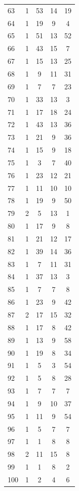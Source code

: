 \documentclass[12pt,a4paper]{report}
\begin{document}
\begin{appendices}
\begin{longtable}{lcccc}
63  &   1 &  53 &  14 &  19 \\
64  &   1 &  19 &   9 &   4 \\
65  &   1 &  51 &  13 &  52 \\
66  &   1 &  43 &  15 &   7 \\
67  &   1 &  15 &  13 &  25 \\
68  &   1 &   9 &  11 &  31 \\
69  &   1 &   7 &   7 &  23 \\
70  &   1 &  33 &  13 &   3 \\
71  &   1 &  17 &  18 &  24 \\
72  &   1 &  43 &  13 &  36 \\
73  &   1 &  21 &   9 &  36 \\
74  &   1 &  15 &   9 &  18 \\
75  &   1 &   3 &   7 &  40 \\
76  &   1 &  23 &  12 &  21 \\
77  &   1 &  11 &  10 &  10 \\
78  &   1 &  19 &   9 &  50 \\
79  &   2 &   5 &  13 &   1 \\
80  &   1 &  17 &   9 &   8 \\
81  &   1 &  21 &  12 &  17 \\
82  &   1 &  39 &  14 &  36 \\
83  &   1 &   7 &  11 &  31 \\
84  &   1 &  37 &  13 &   3 \\
85  &   1 &   7 &   7 &   8 \\
86  &   1 &  23 &   9 &  42 \\
87  &   2 &  17 &  15 &  32 \\
88  &   1 &  17 &   8 &  42 \\
89  &   1 &  13 &   9 &  58 \\
90  &   1 &  19 &   8 &  34 \\
91  &   1 &   5 &   3 &  54 \\
92  &   1 &   5 &   8 &  28 \\
93  &   1 &   7 &   7 &   7 \\
94  &   1 &   9 &  10 &  37 \\
95  &   1 &  11 &   9 &  54 \\
96  &   1 &   5 &   7 &   7 \\
97  &   1 &   1 &   8 &   8 \\
98  &   2 &  11 &  15 &   8 \\
99  &   1 &   1 &   8 &   2 \\
100 &   1 &   2 &   4 &   6 \\
\bottomrule
\end{longtable}


\end{appendices}
\end{document}
